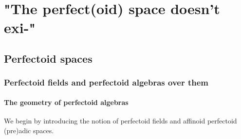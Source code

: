     \section{"The perfect(oid) space doesn't exi-"} \label{section: perfectoid_spaces}
        \subsection{Perfectoid spaces}
            \subsubsection{Perfectoid fields and perfectoid algebras over them}
                \paragraph{The geometry of perfectoid algebras}
                    We begin by introducing the notion of perfectoid fields and affinoid perfectoid (pre)adic spaces.
                
